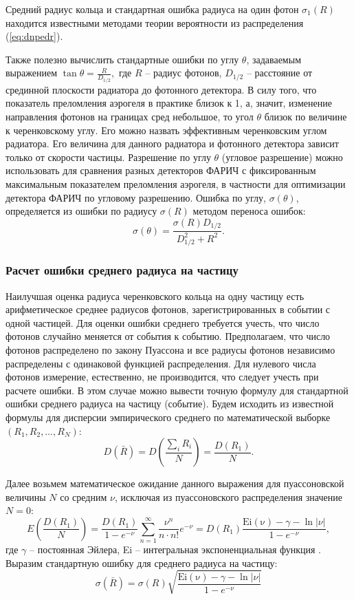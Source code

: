 \documentclass[12pt]{article}
\begin{document}
Средний радиус кольца и стандартная ошибка радиуса на один фотон $\sigma_1(R)$ находится известными методами теории вероятности из распределения (\ref{eq:dnpedr}).

Также полезно вычислить стандартные ошибки по углу $\theta$, задаваемым выражением 
\(\tan\theta = \frac{R}{D_{1/2}},\)
где $R$ -- радиус фотонов, $D_{1/2}$ -- расстояние от срединной плоскости радиатора до фотонного детектора.
В силу того, что показатель преломления аэрогеля в практике близок к 1, а, значит, изменение направления фотонов на границах сред небольшое, то 
угол $\theta$ близок по величине к черенковскому углу. Его можно назвать эффективным черенковским углом радиатора. Его величина для данного радиатора и фотонного детектора
зависит только от скорости частицы. Разрешение по углу $\theta$ (угловое разрешение) можно использовать для сравнения разных детекторов ФАРИЧ с фиксированным максимальным 
показателем преломления аэрогеля, в частности для оптимизации детектора ФАРИЧ по угловому разрешению.
Ошибка по углу, $\sigma(\theta)$, определяется из ошибки по радиусу $\sigma(R)$ методом переноса ошибок:
\[\sigma(\theta) = \frac{\sigma(R) D_{1/2}}{D_{1/2}^2+R^2}.\]

\subsubsection*{Расчет ошибки среднего радиуса на частицу}
Наилучшая оценка радиуса черенковского кольца на одну частицу есть арифметическое среднее радиусов фотонов, зарегистрированных в событии с одной частицей. 
Для оценки ошибки среднего требуется учесть, что число фотонов случайно меняется от события к событию. Предполагаем, что число фотонов
распределено по закону Пуассона и все радиусы фотонов независимо распределены с одинаковой функцией распределения. Для нулевого числа фотонов 
измерение, естественно, не производится, что следует учесть при расчете ошибки. 
В этом случае  можно вывести точную формулу для стандартной ошибки среднего радиуса на частицу (событие).
Будем исходить из известной формулы для дисперсии эмпирического среднего по математической выборке $(R_1, R_2, \ldots, R_N)$:
\[\displaystyle D(\bar{R}) = D\left(\frac{\sum_i R_i}{N}\right) = \frac{D(R_1)}{N}.\]

Далее возьмем математическое ожидание данного выражения для пуассоновской величины $N$ со средним $\nu$, исключая из пуассоновского распределения
значение $N=0$:
\[
E\left(\frac{D(R_1)}{N}\right) = \frac{D(R_1)}{1-e^{-\nu}} \sum_{n=1}^{\infty} \frac{\nu^n}{n\cdot n!} e^{-\nu} = D(R_1) \frac{\mathrm{Ei(\nu)}-\gamma-\ln|\nu|}{1-e^{-\nu}},
\]
где $\gamma$ -- постоянная Эйлера, Ei -- интегральная экспоненциальная функция \cite{prudn}. Выразим стандартную ошибку для среднего радиуса на частицу:
\begin{equation}
\sigma(\bar{R}) = \sigma(R) \sqrt{\frac{\mathrm{Ei(\nu)}-\gamma-\ln|\nu|}{1-e^{-\nu}}}
\label{eq:sigmean}
\end{equation}
\end{document}
